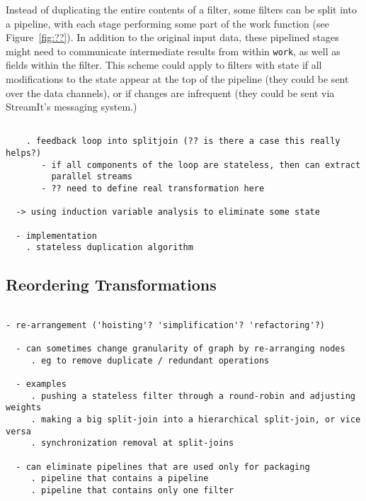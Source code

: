 Instead of duplicating the entire contents of a filter, some filters
can be split into a pipeline, with each stage performing some part of
the work function (see Figure~\ref{fig:??}).  In addition to the
original input data, these pipelined stages might need to communicate
intermediate results from within {\tt work}, as well as fields within
the filter.  This scheme could apply to filters with state if all
modifications to the state appear at the top of the pipeline (they
could be sent over the data channels), or if changes are infrequent
(they could be sent via StreamIt's messaging system.)

\begin{verbatim}

    . feedback loop into splitjoin (?? is there a case this really helps?)
       - if all components of the loop are stateless, then can extract
         parallel streams
       - ?? need to define real transformation here

  -> using induction variable analysis to eliminate some state

  - implementation
    . stateless duplication algorithm

\end{verbatim}

\subsection{Reordering Transformations}

\begin{verbatim}

- re-arrangement ('hoisting'? 'simplification'? 'refactoring'?)

  - can sometimes change granularity of graph by re-arranging nodes
     . eg to remove duplicate / redundant operations

  - examples
     . pushing a stateless filter through a round-robin and adjusting weights
     . making a big split-join into a hierarchical split-join, or vice versa
     . synchronization removal at split-joins

  - can eliminate pipelines that are used only for packaging
     . pipeline that contains a pipeline
     . pipeline that contains only one filter

\end{verbatim}



